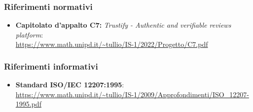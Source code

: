 \subsubsection{Riferimenti normativi}
\begin{itemize}
    \item \textbf{Capitolato d'appalto C7:} \textit{Trustify - Authentic and verifiable reviews platform}: \\
          \url{https://www.math.unipd.it/~tullio/IS-1/2022/Progetto/C7.pdf}
\end{itemize}
\subsubsection{Riferimenti informativi}
\begin{itemize}
    \item \textbf{Standard ISO/IEC 12207:1995}: \\
          \url{https://www.math.unipd.it/~tullio/IS-1/2009/Approfondimenti/ISO_12207-1995.pdf}
\end{itemize}